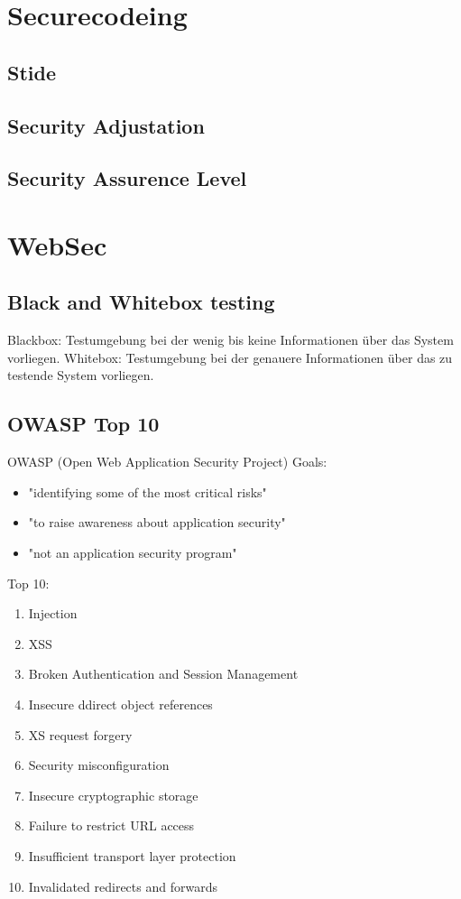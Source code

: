 \documentclass[a4paper, 12pt]{article}
\begin{document}
\section{Securecodeing}
\subsection{Stide}
\subsection{Security Adjustation}
\subsection{Security Assurence Level}

\section{WebSec}
\subsection{Black and Whitebox testing}
	\large Blackbox:
	Testumgebung bei der wenig bis keine Informationen über das System vorliegen.
	\large Whitebox:
	Testumgebung bei der genauere Informationen über das zu testende System vorliegen.
\subsection{OWASP Top 10}
	\large OWASP (Open Web Application Security Project)
	\newbox
	\large Goals:
	\begin{itemize}
		\item "identifying some of the most critical risks"
		\item "to raise awareness about application security"
		\item "not an application security program"
	\end{itemize}
	\newbox
	\large Top 10:
	\begin{enumerate}
		\item Injection
		\item XSS
		\item Broken Authentication and Session Management
		\item Insecure ddirect object references
		\item XS request forgery
		\item Security misconfiguration
		\item Insecure cryptographic storage
		\item Failure to restrict URL access
		\item Insufficient transport layer protection
		\item Invalidated redirects and forwards
	\end{enumerate}
\end{document}
